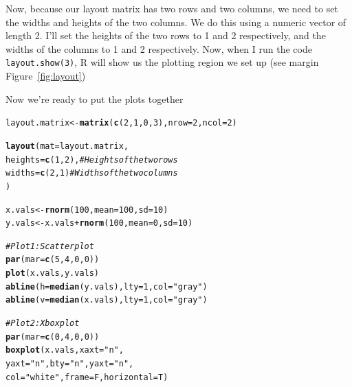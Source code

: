 \documentclass{tufte-book}\usepackage[]{graphicx}\usepackage[]{color}
\makeatletter
\newcommand{\hlnum}[1]{\textcolor[rgb]{0.686,0.059,0.569}{#1}}%
\newcommand{\hlstr}[1]{\textcolor[rgb]{0.192,0.494,0.8}{#1}}%
\newcommand{\hlcom}[1]{\textcolor[rgb]{0.678,0.584,0.686}{\textit{#1}}}%
\newcommand{\hlopt}[1]{\textcolor[rgb]{0,0,0}{#1}}%
\newcommand{\hlstd}[1]{\textcolor[rgb]{0.345,0.345,0.345}{#1}}%
\newcommand{\hlkwb}[1]{\textcolor[rgb]{0.69,0.353,0.396}{#1}}%
\newcommand{\hlkwc}[1]{\textcolor[rgb]{0.333,0.667,0.333}{#1}}%
\newcommand{\hlkwd}[1]{\textcolor[rgb]{0.737,0.353,0.396}{\textbf{#1}}}%
\newenvironment{kframe}{%
 \def\at@end@of@kframe{}%
 \ifinner\ifhmode%
  \def\at@end@of@kframe{\end{minipage}}%
  \begin{minipage}{\columnwidth}%
 \fi\fi%
 \def\FrameCommand##1{\hskip\@totalleftmargin \hskip-\fboxsep
 \colorbox{shadecolor}{##1}\hskip-\fboxsep
     \hskip-\linewidth \hskip-\@totalleftmargin \hskip\columnwidth}%
 \MakeFramed {\advance\hsize-\width
   \@totalleftmargin\z@ \linewidth\hsize
   \@setminipage}}%
 {\par\unskip\endMakeFramed%
 \at@end@of@kframe}
\newenvironment{knitrout}{}{} %
\makeatother
\begin{document}
\begin{footnotesize}
Now, because our layout matrix has two rows and two columns, we need to set the widths and heights of the two columns. We do this using a numeric vector of length 2. I'll set the heights of the two rows to 1 and 2 respectively, and the widths of the columns to 1 and 2 respectively. Now, when I run the code \texttt{layout.show(3)}, R will show us the plotting region we set up (see margin Figure~\ref{fig:layout})

Now we're ready to put the plots together

\begin{footnotesize}
\begin{knitrout}
\color{fgcolor}\begin{kframe}
\begin{alltt}
\hlstd{layout.matrix} \hlkwb{<-} \hlkwd{matrix}\hlstd{(}\hlkwd{c}\hlstd{(}\hlnum{2}\hlstd{,} \hlnum{1}\hlstd{,} \hlnum{0}\hlstd{,} \hlnum{3}\hlstd{),} \hlkwc{nrow} \hlstd{=} \hlnum{2}\hlstd{,} \hlkwc{ncol} \hlstd{=} \hlnum{2}\hlstd{)}

\hlkwd{layout}\hlstd{(}\hlkwc{mat} \hlstd{= layout.matrix,}
       \hlkwc{heights} \hlstd{=} \hlkwd{c}\hlstd{(}\hlnum{1}\hlstd{,} \hlnum{2}\hlstd{),} \hlcom{# Heights of the two rows}
       \hlkwc{widths} \hlstd{=} \hlkwd{c}\hlstd{(}\hlnum{2}\hlstd{,} \hlnum{1}\hlstd{)} \hlcom{# Widths of the two columns}
       \hlstd{)}

\hlstd{x.vals} \hlkwb{<-} \hlkwd{rnorm}\hlstd{(}\hlnum{100}\hlstd{,} \hlkwc{mean} \hlstd{=} \hlnum{100}\hlstd{,} \hlkwc{sd} \hlstd{=} \hlnum{10}\hlstd{)}
\hlstd{y.vals} \hlkwb{<-} \hlstd{x.vals} \hlopt{+} \hlkwd{rnorm}\hlstd{(}\hlnum{100}\hlstd{,} \hlkwc{mean} \hlstd{=} \hlnum{0}\hlstd{,} \hlkwc{sd} \hlstd{=} \hlnum{10}\hlstd{)}

\hlcom{# Plot 1: Scatterplot}
\hlkwd{par}\hlstd{(}\hlkwc{mar} \hlstd{=} \hlkwd{c}\hlstd{(}\hlnum{5}\hlstd{,} \hlnum{4}\hlstd{,} \hlnum{0}\hlstd{,} \hlnum{0}\hlstd{))}
\hlkwd{plot}\hlstd{(x.vals, y.vals)}
\hlkwd{abline}\hlstd{(}\hlkwc{h} \hlstd{=} \hlkwd{median}\hlstd{(y.vals),} \hlkwc{lty} \hlstd{=} \hlnum{1}\hlstd{,} \hlkwc{col} \hlstd{=} \hlstr{"gray"}\hlstd{)}
\hlkwd{abline}\hlstd{(}\hlkwc{v} \hlstd{=} \hlkwd{median}\hlstd{(x.vals),} \hlkwc{lty} \hlstd{=} \hlnum{1}\hlstd{,} \hlkwc{col} \hlstd{=} \hlstr{"gray"}\hlstd{)}


\hlcom{# Plot 2: X boxplot}
\hlkwd{par}\hlstd{(}\hlkwc{mar} \hlstd{=} \hlkwd{c}\hlstd{(}\hlnum{0}\hlstd{,} \hlnum{4}\hlstd{,} \hlnum{0}\hlstd{,} \hlnum{0}\hlstd{))}
\hlkwd{boxplot}\hlstd{(x.vals,} \hlkwc{xaxt} \hlstd{=} \hlstr{"n"}\hlstd{,}
        \hlkwc{yaxt} \hlstd{=} \hlstr{"n"}\hlstd{,} \hlkwc{bty} \hlstd{=} \hlstr{"n"}\hlstd{,} \hlkwc{yaxt} \hlstd{=} \hlstr{"n"}\hlstd{,}
        \hlkwc{col} \hlstd{=} \hlstr{"white"}\hlstd{,} \hlkwc{frame} \hlstd{= F,} \hlkwc{horizontal} \hlstd{= T)}


\end{alltt}
\end{kframe}
\end{knitrout}
\end{footnotesize}
\end{footnotesize}
\end{document}
